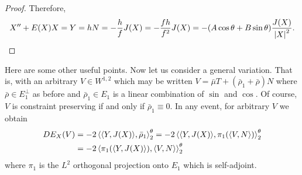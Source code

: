 \documentclass[12pt]{article}
\begin{document}
\begin{proof}
Therefore,
\[
X'' + E(X) X = Y = hN = -\frac{h}{f} J(X) = -\frac{fh}{f^2} J(X) = -(A \cos\theta + B \sin\theta) \frac{J(X)}{\left|{X}\right|^2}.
\]
\end{proof}

\begin{rem}
{\color{red} Here are some other useful points.}
Now let us consider a general variation. That is, with an arbitrary \(V \in W^{1,2}\) which may be written \(V = \bar{\mu}T + (\bar{\rho}_1 + \bar{\rho}) N\) where \(\bar{\rho} \in E_1^{\perp}\) as before and \(\bar{\rho}_1 \in E_1\) is a linear combination of \(\sin\) and \(\cos\). Of course, \(V\) is constraint preserving if and only if \(\bar{\rho}_1 \equiv 0\). In any event, for arbitrary \(V\) we obtain
\[
\begin{split}
DE_X(V) &= -2 \left\langle{\ensuremath{\left\langle{Y},{J(X)}\right\rangle}},{\bar{\rho}_1}\right\rangle_2^{\theta} = -2\left\langle{\ensuremath{\left\langle{Y},{J(X)}\right\rangle}},{\pi_1(\left\langle{V},{N}\right\rangle)}\right\rangle_2^{\theta} \\
&= -2\left\langle{\pi_1(\ensuremath{\left\langle{Y},{J(X)}\right\rangle})},{\left\langle{V},{N}\right\rangle}\right\rangle_2^{\theta}
\end{split}
\]
where \(\pi_1\) is the \(L^2\) orthogonal projection onto \(E_1\) which is self-adjoint.
\end{rem}
\end{document}
